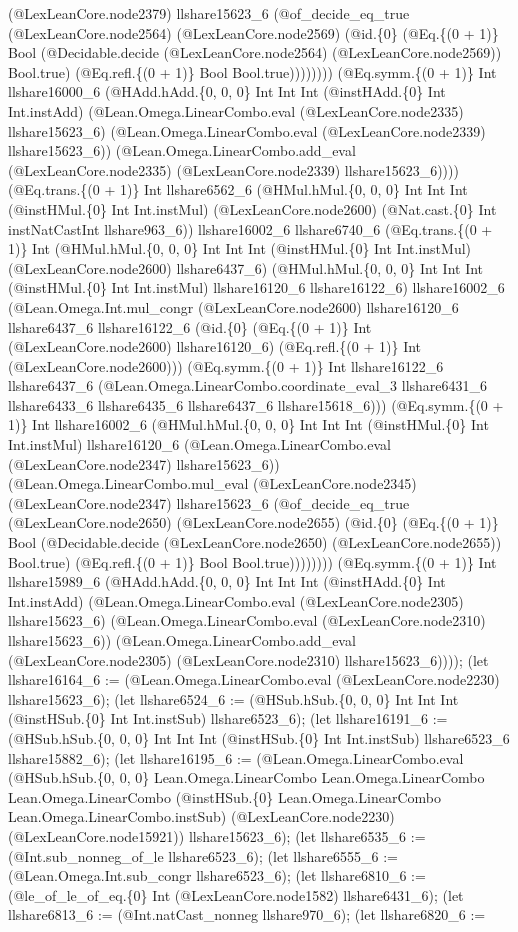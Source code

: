 \documentclass[11pt]{article}
\begin{document}
(@LexLeanCore.node2379) llshare15623\_6 (@of\_decide\_eq\_true (@LexLeanCore.node2564) (@LexLeanCore.node2569) (@id.\{0\} (@Eq.\{(0 + 1)\} Bool (@Decidable.decide (@LexLeanCore.node2564) (@LexLeanCore.node2569)) Bool.true) (@Eq.refl.\{(0 + 1)\} Bool Bool.true)))))))) (@Eq.symm.\{(0 + 1)\} Int llshare16000\_6 (@HAdd.hAdd.\{0, 0, 0\} Int Int Int (@instHAdd.\{0\} Int Int.instAdd) (@Lean.Omega.LinearCombo.eval (@LexLeanCore.node2335) llshare15623\_6) (@Lean.Omega.LinearCombo.eval (@LexLeanCore.node2339) llshare15623\_6)) (@Lean.Omega.LinearCombo.add\_eval (@LexLeanCore.node2335) (@LexLeanCore.node2339) llshare15623\_6)))) (@Eq.trans.\{(0 + 1)\} Int llshare6562\_6 (@HMul.hMul.\{0, 0, 0\} Int Int Int (@instHMul.\{0\} Int Int.instMul) (@LexLeanCore.node2600) (@Nat.cast.\{0\} Int instNatCastInt llshare963\_6)) llshare16002\_6 llshare6740\_6 (@Eq.trans.\{(0 + 1)\} Int (@HMul.hMul.\{0, 0, 0\} Int Int Int (@instHMul.\{0\} Int Int.instMul) (@LexLeanCore.node2600) llshare6437\_6) (@HMul.hMul.\{0, 0, 0\} Int Int Int (@instHMul.\{0\} Int Int.instMul) llshare16120\_6 llshare16122\_6) llshare16002\_6 (@Lean.Omega.Int.mul\_congr (@LexLeanCore.node2600) llshare16120\_6 llshare6437\_6 llshare16122\_6 (@id.\{0\} (@Eq.\{(0 + 1)\} Int (@LexLeanCore.node2600) llshare16120\_6) (@Eq.refl.\{(0 + 1)\} Int (@LexLeanCore.node2600))) (@Eq.symm.\{(0 + 1)\} Int llshare16122\_6 llshare6437\_6 (@Lean.Omega.LinearCombo.coordinate\_eval\_3 llshare6431\_6 llshare6433\_6 llshare6435\_6 llshare6437\_6 llshare15618\_6))) (@Eq.symm.\{(0 + 1)\} Int llshare16002\_6 (@HMul.hMul.\{0, 0, 0\} Int Int Int (@instHMul.\{0\} Int Int.instMul) llshare16120\_6 (@Lean.Omega.LinearCombo.eval (@LexLeanCore.node2347) llshare15623\_6)) (@Lean.Omega.LinearCombo.mul\_eval (@LexLeanCore.node2345) (@LexLeanCore.node2347) llshare15623\_6 (@of\_decide\_eq\_true (@LexLeanCore.node2650) (@LexLeanCore.node2655) (@id.\{0\} (@Eq.\{(0 + 1)\} Bool (@Decidable.decide (@LexLeanCore.node2650) (@LexLeanCore.node2655)) Bool.true) (@Eq.refl.\{(0 + 1)\} Bool Bool.true)))))))) (@Eq.symm.\{(0 + 1)\} Int llshare15989\_6 (@HAdd.hAdd.\{0, 0, 0\} Int Int Int (@instHAdd.\{0\} Int Int.instAdd) (@Lean.Omega.LinearCombo.eval (@LexLeanCore.node2305) llshare15623\_6) (@Lean.Omega.LinearCombo.eval (@LexLeanCore.node2310) llshare15623\_6)) (@Lean.Omega.LinearCombo.add\_eval (@LexLeanCore.node2305) (@LexLeanCore.node2310) llshare15623\_6)))); (let llshare16164\_6 := (@Lean.Omega.LinearCombo.eval (@LexLeanCore.node2230) llshare15623\_6); (let llshare6524\_6 := (@HSub.hSub.\{0, 0, 0\} Int Int Int (@instHSub.\{0\} Int Int.instSub) llshare6523\_6); (let llshare16191\_6 := (@HSub.hSub.\{0, 0, 0\} Int Int Int (@instHSub.\{0\} Int Int.instSub) llshare6523\_6 llshare15882\_6); (let llshare16195\_6 := (@Lean.Omega.LinearCombo.eval (@HSub.hSub.\{0, 0, 0\} Lean.Omega.LinearCombo Lean.Omega.LinearCombo Lean.Omega.LinearCombo (@instHSub.\{0\} Lean.Omega.LinearCombo Lean.Omega.LinearCombo.instSub) (@LexLeanCore.node2230) (@LexLeanCore.node15921)) llshare15623\_6); (let llshare6535\_6 := (@Int.sub\_nonneg\_of\_le llshare6523\_6); (let llshare6555\_6 := (@Lean.Omega.Int.sub\_congr llshare6523\_6); (let llshare6810\_6 := (@le\_of\_le\_of\_eq.\{0\} Int (@LexLeanCore.node1582) llshare6431\_6); (let llshare6813\_6 := (@Int.natCast\_nonneg llshare970\_6); (let llshare6820\_6 := 
\end{document}
